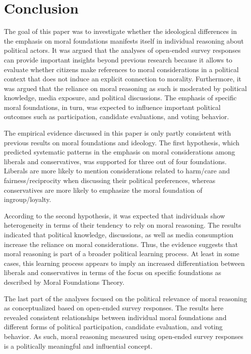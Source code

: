 \documentclass[12pt]{article}
\begin{document}
\section{Conclusion}

The goal of this paper was to investigate whether the ideological differences in the emphasis on moral foundations manifests itself in individual reasoning about political actors. It was argued that the analyses of open-ended survey responses can provide important insights beyond previous research because it allows to evaluate whether citizens make references to moral considerations in a political context that does not induce an explicit connection to morality. Furthermore, it was argued that the reliance on moral reasoning as such is moderated by political knowledge, media exposure, and political discussions. The emphasis of specific moral foundations, in turn, was expected to influence important political outcomes such as participation, candidate evaluations, and voting behavior.

The empirical evidence discussed in this paper is only partly consistent with previous results on moral foundations and ideology. The first hypothesis, which predicted systematic patterns in the emphasis on moral considerations among liberals and conservatives, was supported for three out of four foundations. Liberals are more likely to mention considerations related to harm/care and fairness/reciprocity when discussing their political preferences, whereas conservatives are more likely to emphasize the moral foundation of ingroup/loyalty.

According to the second hypothesis, it was expected that individuals show heterogeneity in terms of their tendency to rely on moral reasoning. The results indicated that political knowledge, discussions, as well as media consumption increase the reliance on moral considerations. Thus, the evidence suggests that moral reasoning is part of a broader political learning process. At least in some cases, this learning process appears to imply an increased differentiation between liberals and conservatives in terms of the focus on specific foundations as described by Moral Foundations Theory.

The last part of the analyses focused on the political relevance of moral reasoning as conceptualized based on open-ended survey responses. The results here revealed consistent relationships between individual moral foundations and different forms of political participation, candidate evaluation, and voting behavior. As such, moral reasoning measured using open-ended survey responses is a politically meaningful and influential concept.
\end{document}

